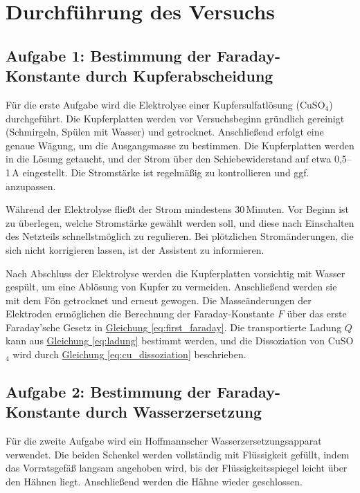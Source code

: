 \chapter{Durchführung des Versuchs}

\section*{Aufgabe 1: Bestimmung der Faraday-Konstante durch Kupferabscheidung}

Für die erste Aufgabe wird die Elektrolyse einer Kupfersulfatlösung (CuSO$_4$) durchgeführt. Die Kupferplatten werden vor Versuchsbeginn gründlich gereinigt (Schmirgeln, Spülen mit Wasser) und getrocknet. Anschließend erfolgt eine genaue Wägung, um die Ausgangsmasse zu bestimmen. Die Kupferplatten werden in die Lösung getaucht, und der Strom über den Schiebewiderstand auf etwa 0,5–1\,A eingestellt. Die Stromstärke ist regelmäßig zu kontrollieren und ggf. anzupassen.  

Während der Elektrolyse fließt der Strom mindestens 30\,Minuten. Vor Beginn ist zu überlegen, welche Stromstärke gewählt werden soll, und diese nach Einschalten des Netzteils schnellstmöglich zu regulieren. Bei plötzlichen Stromänderungen, die sich nicht korrigieren lassen, ist der Assistent zu informieren.  

Nach Abschluss der Elektrolyse werden die Kupferplatten vorsichtig mit Wasser gespült, um eine Ablösung von Kupfer zu vermeiden. Anschließend werden sie mit dem Fön getrocknet und erneut gewogen. Die Masseänderungen der Elektroden ermöglichen die Berechnung der Faraday-Konstante $F$ über das erste Faraday’sche Gesetz in \hyperref[eq:first_faraday]{Gleichung \ref*{eq:first_faraday}}. Die transportierte Ladung $Q$ kann aus \hyperref[eq:ladung]{Gleichung \ref*{eq:ladung}} bestimmt werden, und die Dissoziation von CuSO$_4$ wird durch \hyperref[eq:cu_dissoziation]{Gleichung \ref*{eq:cu_dissoziation}} beschrieben.

\section*{Aufgabe 2: Bestimmung der Faraday-Konstante durch Wasserzersetzung}

Für die zweite Aufgabe wird ein Hoffmannscher Wasserzersetzungsapparat verwendet. Die beiden Schenkel werden vollständig mit Flüssigkeit gefüllt, indem das Vorratsgefäß langsam angehoben wird, bis der Flüssigkeitsspiegel leicht über den Hähnen liegt. Anschließend werden die Hähne wieder geschlossen.  

